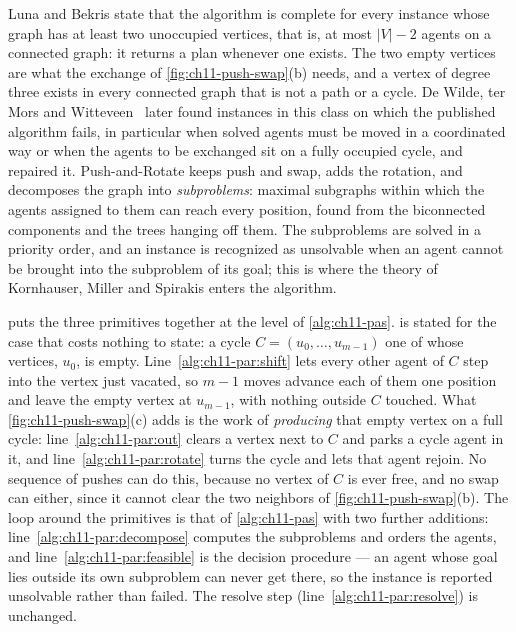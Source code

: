 Luna and Bekris state that the algorithm is complete for every instance
whose graph has at least two unoccupied vertices, that is, at most $|V| - 2$
agents on a connected graph: it returns a plan whenever one
exists. The two empty vertices are what
the exchange of \cref{fig:ch11-push-swap}(b) needs, and a vertex of degree
three exists in every connected graph that is not a path or a cycle. De
Wilde, ter Mors and Witteveen~\cite{dewilde2014push} later found instances
in this class on which the published algorithm fails, in particular when
solved agents must be moved in a coordinated way or when the agents to be
exchanged sit on a fully occupied cycle, and repaired it. Push-and-Rotate
keeps push and swap, adds the rotation, and decomposes the graph into
\emph{subproblems}: maximal subgraphs within which the agents assigned to
them can reach every position, found from the biconnected components and
the trees hanging off them. The subproblems are solved in a priority
order, and an instance is recognized as unsolvable when an agent cannot be
brought into the subproblem of its goal; this is where the theory of
Kornhauser, Miller and Spirakis enters the algorithm.

 puts the three primitives together at the level of
\cref{alg:ch11-pas}. \PasRotate is stated for the case that costs nothing to
state: a cycle $C = (u_0, \dots, u_{m-1})$ one of whose vertices, $u_0$, is
empty. Line~\ref{alg:ch11-par:shift} lets every other agent of $C$ step into
the vertex just vacated, so $m-1$ moves advance each of them one position and
leave the empty vertex at $u_{m-1}$, with nothing outside $C$ touched. What
\cref{fig:ch11-push-swap}(c) adds is the work of \emph{producing} that empty
vertex on a full cycle: line~\ref{alg:ch11-par:out} clears a vertex next to $C$
and parks a cycle agent in it, and line~\ref{alg:ch11-par:rotate} turns the
cycle and lets that agent rejoin. No sequence of pushes can do this, because no
vertex of $C$ is ever free, and no swap can either, since it cannot clear the
two neighbors of \cref{fig:ch11-push-swap}(b). The loop around the primitives
is that of \cref{alg:ch11-pas} with two further additions:
line~\ref{alg:ch11-par:decompose} computes the subproblems and orders the
agents, and line~\ref{alg:ch11-par:feasible} is the decision procedure --- an
agent whose goal lies outside its own subproblem can never get there, so the
instance is reported unsolvable rather than failed. The resolve step
(line~\ref{alg:ch11-par:resolve}) is unchanged.

